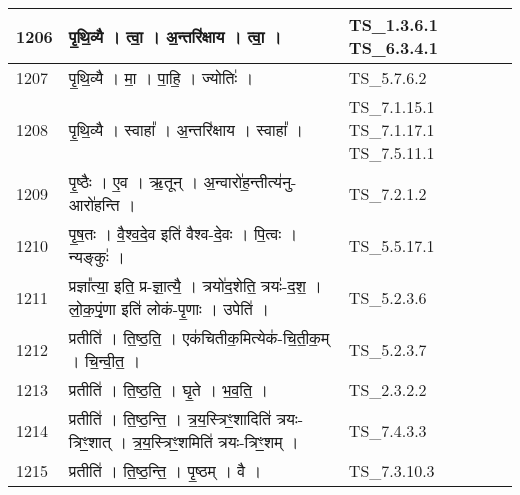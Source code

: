 \documentclass[17pt]{extarticle}
\begin{document}
\begin{longtable}{||p{0.4in}||p{4.9in}||p{0.9in}||}
    \hline
        
    1206 & पृ॒थि॒व्यै   ।   त्वा॒   ।   अ॒न्तरि॑क्षाय   ।   त्वा॒   ।    & TS\_1.3.6.1 TS\_6.3.4.1       \\
    
    \hline
        
    1207 & पृ॒थि॒व्यै   ।   मा॒   ।   पा॒हि॒   ।   ज्योतिः॑   ।    & TS\_5.7.6.2       \\
    
    \hline
        
    1208 & पृ॒थि॒व्यै   ।   स्वाहा᳚   ।   अ॒न्तरि॑क्षाय   ।   स्वाहा᳚   ।    & TS\_7.1.15.1 TS\_7.1.17.1 TS\_7.5.11.1       \\
    
    \hline
        
    1209 & पृ॒ष्ठैः   ।   ए॒व   ।   ऋ॒तून्   ।   अ॒न्वारो॑ह॒न्तीत्य॑नु{-}आरो॑हन्ति   ।    & TS\_7.2.1.2       \\
    
    \hline
        
    1210 & पृ॒ष॒तः   ।   वै॒श्व॒दे॒व इति॑ वैश्व{-}दे॒वः   ।   पि॒त्वः   ।   न्यङ्कुः॑   ।    & TS\_5.5.17.1       \\
    
    \hline
        
    1211 & प्रज्ञा᳚त्या॒ इति॒ प्र{-}ज्ञा॒त्यै॒   ।   त्रयो॑द॒शेति॒ त्रयः॑{-}द॒श॒   ।   लो॒क॒पृं॒णा इति॑ लोकं{-}पृ॒णाः   ।   उपेति॑   ।    & TS\_5.2.3.6       \\
    
    \hline
        
    1212 & प्रतीति॑   ।   ति॒ष्ठ॒ति॒   ।   एक॑चितीक॒मित्येक॑{-}चि॒ती॒क॒म्   ।   चि॒न्वी॒त॒   ।    & TS\_5.2.3.7       \\
    
    \hline
        
    1213 & प्रतीति॑   ।   ति॒ष्ठ॒ति॒   ।   घृ॒ते   ।   भ॒व॒ति॒   ।    & TS\_2.3.2.2       \\
    
    \hline
        
    1214 & प्रतीति॑   ।   ति॒ष्ठ॒न्ति॒   ।   त्र॒य॒स्त्रिꣳ॒॒शादिति॑ त्रयः{-}त्रिꣳ॒॒शात्   ।   त्र॒य॒स्त्रिꣳ॒॒शमिति॑ त्रयः{-}त्रिꣳ॒॒शम्   ।    & TS\_7.4.3.3       \\
    
    \hline
        
    1215 & प्रतीति॑   ।   ति॒ष्ठ॒न्ति॒   ।   पृ॒ष्ठम्   ।   वै   ।    & TS\_7.3.10.3       \\
    

\end{longtable}
\end{document}
